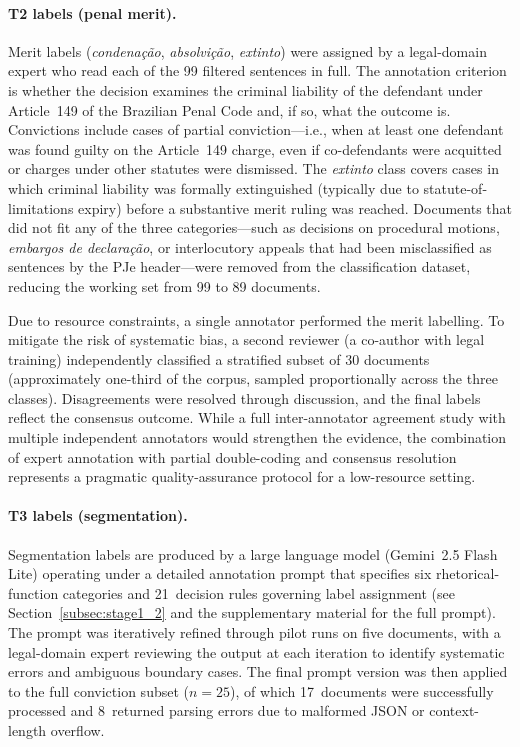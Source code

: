 \documentclass[preprint,a4paper,fleqn]{cas-dc}
\begin{document}
\paragraph{T2 labels (penal merit).}
Merit labels (\textit{condena\c{c}\~ao}, \textit{absolvi\c{c}\~ao}, \textit{extinto}) were assigned by a legal-domain expert who read each of the 99 filtered sentences in full. The annotation criterion is whether the decision examines the criminal liability of the defendant under Article~149 of the Brazilian Penal Code and, if so, what the outcome is. Convictions include cases of partial conviction---i.e., when at least one defendant was found guilty on the Article~149 charge, even if co-defendants were acquitted or charges under other statutes were dismissed. The \textit{extinto} class covers cases in which criminal liability was formally extinguished (typically due to statute-of-limitations expiry) before a substantive merit ruling was reached. Documents that did not fit any of the three categories---such as decisions on procedural motions, \textit{embargos de declara\c{c}\~ao}, or interlocutory appeals that had been misclassified as sentences by the PJe header---were removed from the classification dataset, reducing the working set from 99 to 89 documents.

Due to resource constraints, a single annotator performed the merit labelling. To mitigate the risk of systematic bias, a second reviewer (a co-author with legal training) independently classified a stratified subset of 30 documents (approximately one-third of the corpus, sampled proportionally across the three classes). Disagreements were resolved through discussion, and the final labels reflect the consensus outcome. While a full inter-annotator agreement study with multiple independent annotators would strengthen the evidence, the combination of expert annotation with partial double-coding and consensus resolution represents a pragmatic quality-assurance protocol for a low-resource setting.

\paragraph{T3 labels (segmentation).}
Segmentation labels are produced by a large language model (Gemini~2.5 Flash Lite) operating under a detailed annotation prompt that specifies six rhetorical-function categories and 21~decision rules governing label assignment (see Section~\ref{subsec:stage1_2} and the supplementary material for the full prompt). The prompt was iteratively refined through pilot runs on five documents, with a legal-domain expert reviewing the output at each iteration to identify systematic errors and ambiguous boundary cases. The final prompt version was then applied to the full conviction subset ($n=25$), of which 17~documents were successfully processed and 8~returned parsing errors due to malformed JSON or context-length overflow.
\end{document}

